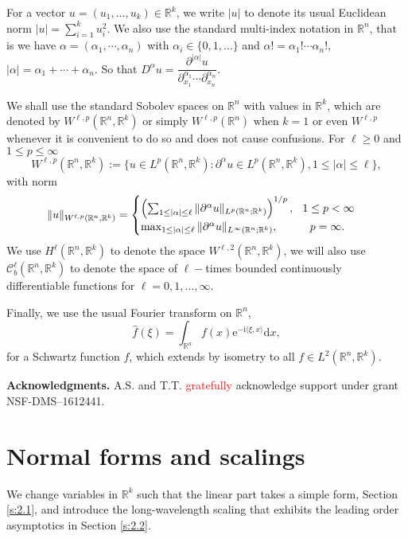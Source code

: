 \documentclass[10pt]{article}
\newenvironment{Acknowledgment}%
 {\begin{trivlist}\item[]\textbf{Acknowledgments.}}{\end{trivlist}}
\newcommand{\R}{\mathbb{R}}
\newcommand{\rmd}{\mathrm{d}}
\newcommand{\rme}{\mathrm{e}}
\newcommand{\rmi}{\mathrm{i}}
\begin{document}
For a vector $u=(u_1,\ldots,u_k) \in \R^k$, we write $|u|$ to denote its usual Euclidean norm $|u| = \sum_{i=1}^{k} u_i^2$. We also use the standard multi-index notation in $\R^n$, that is we have $\alpha = (\alpha_1,\cdots,\alpha_n)$ with $\alpha_i \in \{0,1,\ldots \}$ and $\alpha! = \alpha_1!\cdots\alpha_n!$, $|\alpha|=\alpha_1+\cdots+\alpha_n$. So that 
$D^\alpha u = \dfrac{\partial^{|\alpha |} u}{\partial_{x_1}^{\alpha_1}\cdots \partial_{x_n}^{\alpha_n}}$.

We shall use the standard Sobolev spaces on $\R^n$ with values in $\R^k$, which are denoted by $W^{\ell,p}(\R^n, \R^k)$ or simply $W^{\ell,p}(\R^n)$ when $k=1$ or even $W^{\ell,p}$ whenever it is convenient to do so and does not cause confusions. For $\ell \ge 0$ and $1\le p \le \infty$
\[
W^{\ell,p}(\R^n,\R^k) := \{ u \in L^p(\R^n,\R^k): \partial^\alpha u \in L^p(\R^n,\R^k), 1\le |\alpha| \le \ell \},
\]
with norm
\[
\|u\|_{W^{\ell,p}(\R^n,\R^k)}=
\begin{cases}
\left(\sum_{1\le |\alpha| \le \ell} \|\partial^\alpha u \|_{L^p(\R^n;\R^k)}\right)^{1/p}, \hspace{0.1in}1\le p<\infty \\
\max_{1\le |\alpha| \le \ell}\|\partial^\alpha u\|_{L^\infty(\R^n;\R^k)}, \hspace{0.4in} p=\infty.
\end{cases}
\]
We use $H^\ell(\R^n,\R^k)$ to denote the space $W^{\ell,2}(\R^n,\R^k)$, we will also use $\mathscr{C}_b^\ell(\R^n,\R^k)$ to denote the space of $\ell-$times bounded continuously differentiable functions for $\ell=0,1,\ldots,\infty$.
 
Finally, we use the usual Fourier transform on $\R^n$, 
\[
\widehat{f} (\xi)= \int_{\R^n} f(x)\rme^{-\rmi \langle \xi,x\rangle}\rmd x {,}
\]
 for a Schwartz function $f$, which extends by isometry to all $f \in L^2(\R^n,\R^k)$. 

 \begin{Acknowledgment}
 A.S. and T.T. \textcolor{red}{gratefully} acknowledge support under grant NSF-DMS--1612441.
 \end{Acknowledgment}

\section{Normal forms and scalings}\label{s:2}
We change variables in $\R^k$ such that the linear part takes a simple form, Section \ref{s:2.1}, and introduce the long-wavelength scaling that exhibits the leading order asymptotics in Section \ref{s:2.2}.
\end{document}
